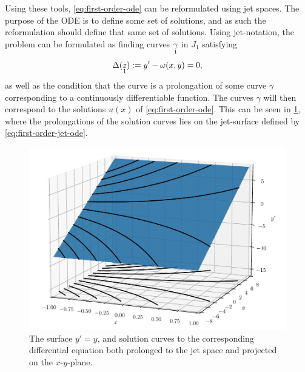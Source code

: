 Using these tools, \cref{eq:first-order-ode} can be reformulated using jet spaces.
The purpose of the ODE is to define some set of solutions, and as such the reformulation should define that same set of solutions.
Using jet-notation, the problem can be formulated as finding curves \(\prolong{\gamma}{1}\) in \(J_1\) satisfying
\begin{equation} \label{eq:first-order-jet-ode}
  \Delta(\prolong{z}{1}) := y' - \omega(x,y) = 0,
\end{equation}
as well as the condition that the curve is a prolongation of some curve \(\gamma\) corresponding to a continuously differentiable function.
The curves \(\gamma\) will then correspond to the solutions \(u(x)\) of \cref{eq:first-order-ode}.
This can be seen in \cref{fig:jet-surface}, where the prolongations of the solution curves lies on the jet-surface defined by \cref{eq:first-order-jet-ode}.
\begin{figure}
  \centering
  \includegraphics[width=.96\textwidth]{images/jet-surface}
  \caption{The surface \(y' = y\), and solution curves to the corresponding differential equation both prolonged to the jet space and projected on the \(x\)-\(y\)-plane.}
  \label{fig:jet-surface}
\end{figure}


